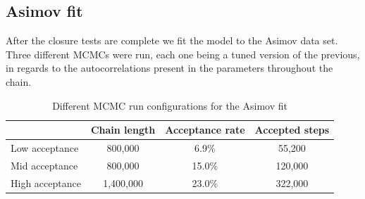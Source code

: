 \subsection{Asimov fit}
\label{sec:asimov_fit}
After the closure tests are complete we fit the model to the Asimov data set. Three different MCMCs were run, each one being a tuned version of the previous, in regards to the autocorrelations present in the parameters throughout the chain.
\begin{table}[h]
	\begin{tabular}{l | c c c}
		\hline
		\hline
							& Chain length  & Acceptance rate & Accepted steps\\
							\hline
		Low acceptance		& 800,000		& 6.9\% 		  & 55,200 \\
		Mid acceptance		& 800,000		& 15.0\% 		  & 120,000\\
		High acceptance		& 1,400,000		& 23.0\%  		  & 322,000 \\
		\hline
		\hline
	\end{tabular}
\caption{Different MCMC run configurations for the Asimov fit}
\label{tab:asimov_mcmc_versions}
\end{table}


